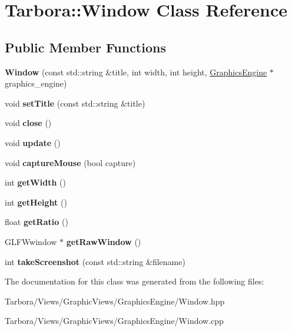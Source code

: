 \hypertarget{classTarbora_1_1Window}{}\section{Tarbora\+:\+:Window Class Reference}
\label{classTarbora_1_1Window}
\subsection*{Public Member Functions}
\begin{DoxyCompactItemize}
\item 
\mbox{\label{classTarbora_1_1Window_a9ccaeef1d7f9e4445c56d224945142cb}} 
{\bfseries Window} (const std\+::string \&title, int width, int height, \hyperlink{classTarbora_1_1GraphicsEngine}{Graphics\+Engine} $\ast$graphics\+\_\+engine)
\item 
\mbox{\label{classTarbora_1_1Window_a8ecdcd5c928e780f0128cc7c99f4f823}} 
void {\bfseries set\+Title} (const std\+::string \&title)
\item 
\mbox{\label{classTarbora_1_1Window_a343fa4ea9982eb298b1b36f4d8a189bd}} 
void {\bfseries close} ()
\item 
\mbox{\label{classTarbora_1_1Window_af462407a8dd0b487b83aaa8d6c6faed2}} 
void {\bfseries update} ()
\item 
\mbox{\label{classTarbora_1_1Window_aa6b406ebbe722ffb33fc025c843ae317}} 
void {\bfseries capture\+Mouse} (bool capture)
\item 
\mbox{\label{classTarbora_1_1Window_a6fbeb897a0c26fa7271c03d21b4d8c34}} 
int {\bfseries get\+Width} ()
\item 
\mbox{\label{classTarbora_1_1Window_ac9fd39537faf43ca3b8a33b2b3f0aa12}} 
int {\bfseries get\+Height} ()
\item 
\mbox{\label{classTarbora_1_1Window_ad23758222424b59ce0f419b509948997}} 
float {\bfseries get\+Ratio} ()
\item 
\mbox{\label{classTarbora_1_1Window_a1457ccb06c33e1993c0e98ad02ea56a1}} 
G\+L\+F\+Wwindow $\ast$ {\bfseries get\+Raw\+Window} ()
\item 
\mbox{\label{classTarbora_1_1Window_a10be2c64abc65c8e296365938e4af184}} 
int {\bfseries take\+Screenshot} (const std\+::string \&filename)
\end{DoxyCompactItemize}


The documentation for this class was generated from the following files\+:\begin{DoxyCompactItemize}
\item 
Tarbora/\+Views/\+Graphic\+Views/\+Graphics\+Engine/Window.\+hpp\item 
Tarbora/\+Views/\+Graphic\+Views/\+Graphics\+Engine/Window.\+cpp\end{DoxyCompactItemize}
